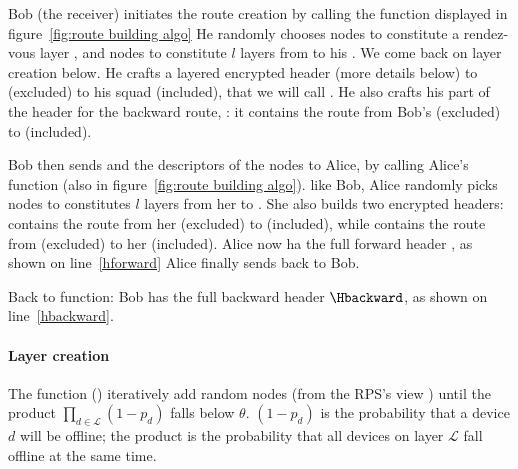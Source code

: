 Bob (the receiver) initiates the route creation by calling the \Recv function displayed in figure~\ref{fig:route building algo}
He randomly chooses nodes to constitute a rendez-vous layer \LRV, and nodes to constitute $l$ layers from \LRV to his \squad. 
We come back on layer creation below.
He crafts a layered encrypted header (more details below) to \LRV (excluded) to his squad (included), that we will call \Hrecforward.
He also crafts his part of the header for the backward route, \Hrecbackward: it contains the route from Bob's \squad (excluded) to \LRV (included).

Bob then sends \Hrecforward and the descriptors of the \LRV nodes to Alice, by calling Alice's \Send function (also in figure~\ref{fig:route building algo}).
like Bob, Alice randomly picks nodes to constitutes $l$ layers from her \squad to \LRV.
She also builds two encrypted headers: \Hsendforward contains the route from her \squad (excluded) to \LRV (included), while \Hsendbackward contains the route from \LRV (excluded) to her \squad (included).
Alice now ha the full forward header \Hforward, as shown on line~\ref{hforward}
Alice finally sends \Hsendbackward back to Bob.

Back to \Recv function: Bob has the full backward header $\Hbackward$, as shown on line~\ref{hbackward}.


\paragraph*{Layer creation}
The function \CreateOnionLayer() iteratively add random nodes (from the RPS's view \view) until the product $\prod_{d\in \mathcal{L}} (1 - p_d)$ falls below $\theta$.
$(1 - p_d)$ is the probability that a device $d$ will be offline; the product is the probability that all devices on layer $\mathcal{L}$ fall offline at the same time.




